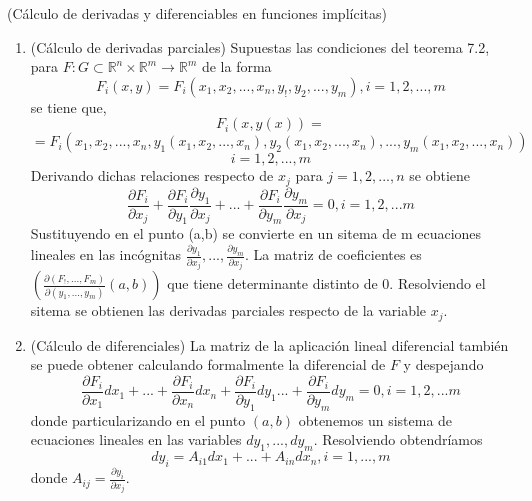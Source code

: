 \begin{obs}(Cálculo de derivadas y diferenciables en funciones implícitas)\\
\begin{enumerate}[label=(\roman*)]
    \item (Cálculo de derivadas parciales)
    Supuestas las condiciones del teorema 7.2, para $F:G\subset\mathbb{R}^n\times\mathbb{R}^m\rightarrow\mathbb{R}^m$ de la forma \[ F_i(x,y) = F_i(x_1,x_2,...,x_n,y_!,y_2,...,y_m), i=1,2,...,m \] se tiene que, \[ F_i(x,y(x)) = \] \[ = F_i(x_1,x_2,...,x_n,y_1(x_1,x_2,...,x_n),y_2(x_1,x_2,...,x_n),...,y_m(x_1,x_2,...,x_n)) \]
    \[ i=1,2,...,m\]
    Derivando dichas relaciones respecto de $x_j$ para $j = 1,2,...,n$ se obtiene \[ \frac{\partial F_i}{\partial x_j} + \frac{\partial F_i}{\partial y_1}\frac{\partial y_1}{\partial x_j} + ... + \frac{\partial F_i}{\partial y_m}\frac{\partial y_m}{\partial x_j} = 0, i = 1,2,...m\] Sustituyendo en el punto (a,b) se convierte en un sitema de m ecuaciones lineales en las incógnitas $\frac{\partial y_1}{\partial x_j},...,\frac{\partial y_m}{\partial x_j}.$ La matriz de coeficientes es $(\frac{\partial (F_!,...,F_m)}{\partial (y_1,...,y_m)}(a,b))$ que tiene determinante distinto de $0$. Resolviendo el sitema se obtienen las derivadas parciales respecto de la variable $x_j$.
    
    \item (Cálculo de diferenciales) La matriz de la aplicación  lineal diferencial también se puede obtener calculando formalmente la diferencial de $F$ y despejando \[ \frac{\partial F_i}{\partial x_1}d x_1 + ... + \frac{\partial F_i}{\partial x_n}d x_n + \frac{\partial F_i}{\partial y_1}d y_1 ... + \frac{\partial F_i}{\partial y_m}d y_m = 0, i = 1,2,...m\] donde particularizando en el punto $(a,b)$ obtenemos un sistema de ecuaciones lineales en las variables $d y_1, ..., d y_m$. Resolviendo obtendríamos \[ d y_i = A_{i1}d x_1 + ... + A_{in}d x_n, i=1,...,m \] donde $A_{ij} = \frac{\partial y_i}{\partial x_j}.$
\end{enumerate}
\end{obs}

